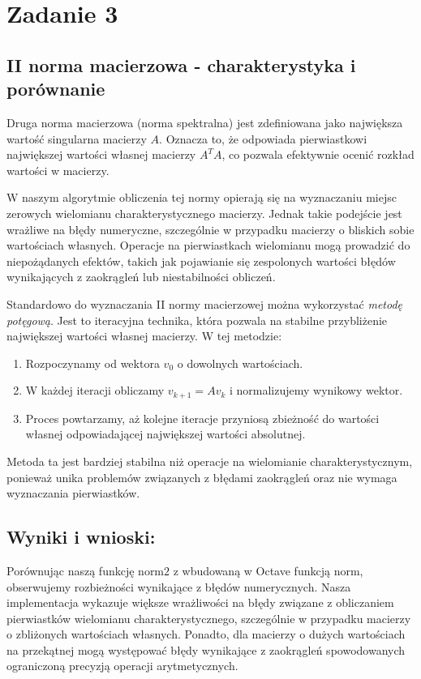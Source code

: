 \section{Zadanie 3}
\subsection{II norma macierzowa - charakterystyka i porównanie}

Druga norma macierzowa (norma spektralna) jest zdefiniowana jako największa wartość singularna macierzy \( A \). Oznacza to, że odpowiada pierwiastkowi największej wartości własnej macierzy \( A^T A \), co pozwala efektywnie ocenić rozkład wartości w macierzy.

W naszym algorytmie obliczenia tej normy opierają się na wyznaczaniu miejsc zerowych wielomianu charakterystycznego macierzy. Jednak takie podejście jest wrażliwe na błędy numeryczne, szczególnie w przypadku macierzy o bliskich sobie wartościach własnych. Operacje na pierwiastkach wielomianu mogą prowadzić do niepożądanych efektów, takich jak pojawianie się zespolonych wartości błędów wynikających z zaokrągleń lub niestabilności obliczeń.

Standardowo do wyznaczania II normy macierzowej można wykorzystać \textit{metodę potęgową}. Jest to iteracyjna technika, która pozwala na stabilne przybliżenie największej wartości własnej macierzy. W tej metodzie:
\begin{enumerate}
    \item Rozpoczynamy od wektora \( v_0 \) o dowolnych wartościach.
    \item W każdej iteracji obliczamy \( v_{k+1} = Av_k \) i normalizujemy wynikowy wektor.
    \item Proces powtarzamy, aż kolejne iteracje przyniosą zbieżność do wartości własnej odpowiadającej największej wartości absolutnej.
\end{enumerate}
Metoda ta jest bardziej stabilna niż operacje na wielomianie charakterystycznym, ponieważ unika problemów związanych z błędami zaokrągleń oraz nie wymaga wyznaczania pierwiastków. 

\subsection{Wyniki i wnioski:}

Porównując naszą funkcję \( \text{norm2} \) z wbudowaną w Octave funkcją \( \text{norm} \), obserwujemy rozbieżności wynikające z błędów numerycznych. Nasza implementacja wykazuje większe wrażliwości na błędy związane z obliczaniem pierwiastków wielomianu charakterystycznego, szczególnie w przypadku macierzy o zbliżonych wartościach własnych. Ponadto, dla macierzy o dużych wartościach na przekątnej mogą występować błędy wynikające z zaokrągleń spowodowanych ograniczoną precyzją operacji arytmetycznych.

